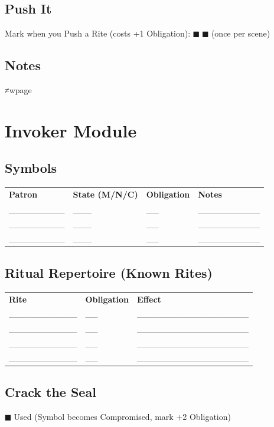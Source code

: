 \documentclass[11pt]{article}
\begin{document}
\subsection*{Push It}
Mark when you Push a Rite (costs +1 Obligation): $■$ $■$ (once per scene)

\subsection*{Notes}
\vspace{5cm}
≠wpage

\section*{Invoker Module}

\subsection*{Symbols}
\small
\begin{tabularx}{\textwidth}{p{3.5cm} p{1.5cm} p{1.5cm} X}
\textbf{Patron} & \textbf{State (M/N/C)} & \textbf{Obligation} & \textbf{Notes} \\
_________ & ___ & __ & __________ \\
_________ & ___ & __ & __________ \\
_________ & ___ & __ & __________ \\
\end{tabularx}
\normalsize

\subsection*{Ritual Repertoire (Known Rites)}
\small
\begin{tabularx}{\textwidth}{p{3cm} p{1.5cm} X}
\textbf{Rite} & \textbf{Obligation} & \textbf{Effect} \\
___________ & __ & __________________ \\
___________ & __ & __________________ \\
___________ & __ & __________________ \\
___________ & __ & __________________ \\
\end{tabularx}
\normalsize

\subsection*{Crack the Seal}
$■$ Used (Symbol becomes Compromised, mark +2 Obligation)
\end{document}
